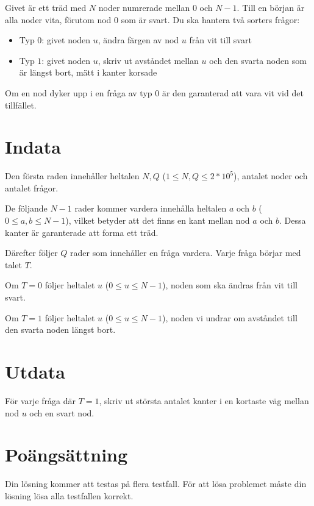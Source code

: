 Givet är ett träd med $N$ noder numrerade mellan $0$ och $N-1$. Till en början är alla noder vita,
förutom nod $0$ som är svart. Du ska hantera två sorters frågor:

\begin{itemize}
    \item Typ $0$: givet noden $u$, ändra färgen av nod $u$ från vit till svart
    \item Typ $1$: givet noden $u$, skriv ut avståndet mellan $u$ och den svarta noden som är längst bort, mätt i kanter korsade
\end{itemize}

Om en nod dyker upp i en fråga av typ $0$ är den garanterad att vara vit vid det tillfället.


\section*{Indata}
Den första raden innehåller heltalen $N, Q$ ($1 \leq N,Q \leq 2*10^5$), antalet noder och antalet frågor.

De följande $N-1$ rader kommer vardera innehålla heltalen $a$ och $b$ ($0 \leq a,b \leq N-1$), vilket
betyder att det finns en kant mellan nod $a$ och $b$. Dessa kanter är garanterade att forma ett träd.

Därefter följer $Q$ rader som innehåller en fråga vardera. Varje fråga börjar med talet $T$.

Om $T=0$ följer heltalet $u$ ($0 \leq u \leq N-1$), noden som ska ändras från vit till svart.

Om $T=1$ följer heltalet $u$ ($0 \leq u \leq N-1$), noden vi undrar om avståndet till den svarta noden längst bort.

\section*{Utdata}
För varje fråga där $T=1$, skriv ut största antalet kanter i en kortaste väg mellan nod $u$ och en svart nod.

\section*{Poängsättning}
Din lösning kommer att testas på flera testfall.
\noindent
För att lösa problemet måste din lösning lösa alla testfallen korrekt.
